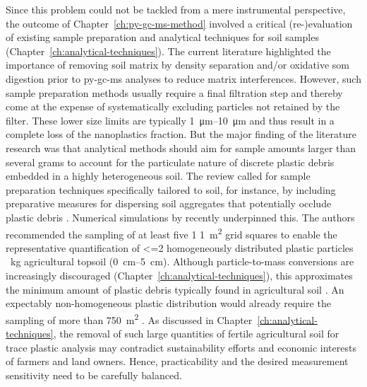 Since this problem could not be tackled from a mere instrumental perspective, the outcome of Chapter~\ref{ch:py-gc-ms-method} involved a critical (re-)evaluation of existing sample preparation and analytical techniques for soil samples (Chapter~\ref{ch:analytical-techniques}). The current literature highlighted the importance of removing soil matrix by density separation and/or oxidative \ac{som} digestion prior to \ac{py-gc-ms} analyses to reduce matrix interferences. However, such sample preparation methods usually require a final filtration step and thereby come at the expense of systematically excluding particles not retained by the filter. These lower size limits are typically \SIrange{1}{10}{\micro\meter} and thus result in a complete loss of the nanoplastics fraction.
But the major finding of the literature research was that analytical methods should aim for sample amounts larger than several grams to account for the particulate nature of discrete plastic debris embedded in a highly heterogeneous soil. The review called for sample preparation techniques specifically tailored to soil, for instance, by including preparative measures for dispersing soil aggregates that potentially occlude plastic debris \citep[Chapter~\ref{ch:intro};][]{ZhangDistribution2018}. Numerical simulations by \citet{YuHow2021} recently underpinned this. The authors recommended the sampling of at least five 1\,\texttimes\,\SI{1}{\square\meter} grid squares to enable the representative quantification of \num{<=2} homogeneously distributed plastic particles \si{\per\kilo\gram} agricultural topsoil (\SIrange{0}{5}{\centi\meter}). Although particle-to-mass conversions are increasingly discouraged (Chapter~\ref{ch:analytical-techniques}), this approximates the minimum amount of plastic debris typically found in agricultural soil \citep{BuksGlobal2020}. An expectably non-homogeneous plastic distribution would already require the sampling of more than \SI{750}{\square\meter} \citep{YuHow2021}. As discussed in Chapter~\ref{ch:analytical-techniques}, the removal of such large quantities of fertile agricultural soil for trace plastic analysis may contradict sustainability efforts and economic interests of farmers and land owners. Hence, practicability and the desired measurement sensitivity need to be carefully balanced.

